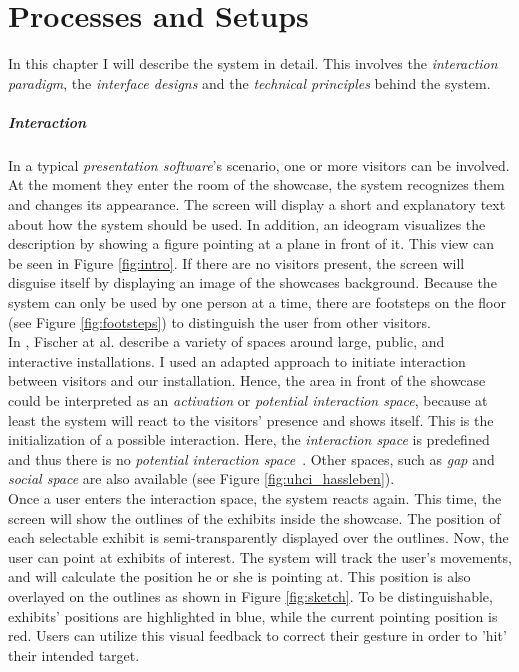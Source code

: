\chapter{Processes and Setups}
\label{installation}

In this chapter I will describe the system in detail. This involves the \textit{interaction paradigm}, the \textit{interface designs} and the \textit{technical principles} behind the system. 


\paragraph{Interaction} 
In a typical \textit{presentation software}'s scenario, one or more visitors can be involved. At the moment they enter the room of the showcase, the system recognizes them and changes its appearance. The screen will display a short and explanatory text about how the system should be used. In addition, an ideogram visualizes the description by showing a figure pointing at a plane in front of it. This view can be seen in Figure \ref{fig:intro}. If there are no visitors present, the screen will disguise itself by displaying an image of the showcases background. Because the system can only be used by one person at a time, there are footsteps on the floor (see Figure \ref{fig:footsteps}) to distinguish the user from other visitors. 
\\
In \cite{UrbanHCI}, Fischer at al. describe a variety of spaces around large, public, and interactive installations. I used an adapted approach to initiate interaction between visitors and our installation. Hence, the area in front of the showcase could be interpreted as an \textit{activation} or \textit{potential interaction space}, because at least the system will react to the visitors' presence and shows itself. This is the initialization of a possible interaction. Here, the \textit{interaction space} is predefined and thus there is no \textit{potential interaction space}~\cite{UrbanHCI}. Other spaces, such as \textit{gap} and \textit{social space} are also available (see Figure \ref{fig:uhci_hassleben}). 
\\
Once a user enters the interaction space, the system reacts again. This time, the screen will show the outlines of the exhibits inside the showcase. The position of each selectable exhibit is semi-transparently displayed over the outlines. Now, the user can point at exhibits of interest. The system will track the user's movements, and will calculate the position he or she is pointing at. This position is also overlayed on the outlines as shown in Figure \ref{fig:sketch}. To be distinguishable, exhibits' positions are  highlighted in blue, while the current pointing position is red. Users can utilize this visual feedback to correct their gesture in order to 'hit' their intended target.
